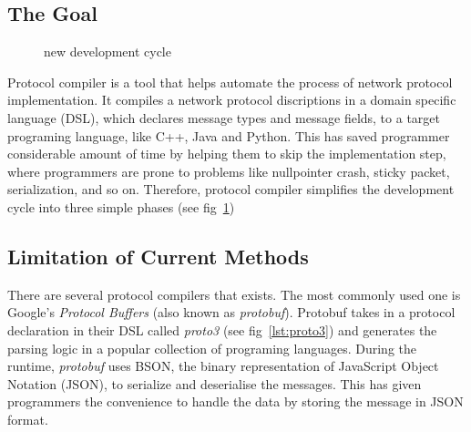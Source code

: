 \documentclass{article}
\begin{document}
\subsection{The Goal}

\begin{figure}[h!]
\begin{center}
\label{fig:newDevelopmentCycle}
\caption{new development cycle}
\end{center}
\end{figure}

Protocol compiler is a tool that helps automate the process of network protocol implementation. It compiles a network protocol discriptions in a domain specific language (DSL), which declares message types and message fields, to a target programing language, like C++, Java and Python. This has saved programmer considerable amount of time by helping them to skip the implementation step, where programmers are prone to problems like nullpointer crash, sticky packet, serialization, and so on. Therefore, protocol compiler simplifies the development cycle into three simple phases (see fig~\ref{fig:newDevelopmentCycle})




\subsection{Limitation of Current Methods}

There are several protocol compilers that exists. The most commonly used one is Google's \textit{Protocol Buffers} (also known as \textit{protobuf}). Protobuf takes in a protocol declaration in their DSL called \textit{proto3} (see fig~\ref{lst:proto3}) and generates the parsing logic in a popular collection of programing languages. During the runtime, \textit{protobuf} uses BSON, the binary representation of JavaScript Object Notation (JSON), to serialize and deserialise the messages. This has given programmers the convenience to handle the data by storing the message in JSON format.\\
\end{document}
